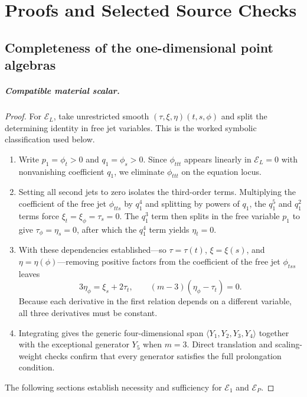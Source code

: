 \documentclass[12pt,a4paper,oneside]{report}
\numberwithin{equation}{chapter}
\theoremstyle{definition}
\theoremstyle{remark}\newtheorem{remark}[theorem]{Remark}
\begin{document}
\appendix
\chapter{Proofs and Selected Source Checks}\label{app:proofs}
\section{Completeness of the one-dimensional point algebras}\label{app:classproof}
\paragraph{Compatible material scalar.}
\begin{proof}
For $\mathcal E_L$, take unrestricted smooth $(\tau,\xi,\eta)(t,s,\phi)$ and split the determining identity in free jet variables. This is the worked symbolic classification used below.
\begin{enumerate}\setlength{\itemsep}{2pt}
\item Write $p_1=\phi_t>0$ and $q_1=\phi_s>0$. Since $\phi_{ttt}$ appears linearly in $\mathcal E_{L}=0$ with nonvanishing coefficient $q_1$, we eliminate $\phi_{ttt}$ on the equation locus.
\item Setting all second jets to zero isolates the third-order terms. Multiplying the coefficient of the free jet $\phi_{tts}$ by $q_1^4$ and splitting by powers of $q_1$, the $q_1^5$ and $q_1^2$ terms force $\xi_t=\xi_\phi=\tau_s=0$. The $q_1^3$ term then splits in the free variable $p_1$ to give $\tau_\phi=\eta_s=0$, after which the $q_1^4$ term yields $\eta_t=0$.
\item With these dependencies established---so $\tau=\tau(t)$, $\xi=\xi(s)$, and $\eta=\eta(\phi)$---removing positive factors from the coefficient of the free jet $\phi_{tss}$ leaves
\[
  3\eta_\phi=\xi_s+2\tau_t,\qquad
  (m-3)(\eta_\phi-\tau_t)=0 .
\]
Because each derivative in the first relation depends on a different variable, all three derivatives must be constant.
\item Integrating gives the generic four-dimensional span $\langle Y_1,Y_2,Y_3,Y_4\rangle$ together with the exceptional generator $Y_5$ when $m=3$. Direct translation and scaling-weight checks confirm that every generator satisfies the full prolongation condition.
\end{enumerate}
The following sections establish necessity and sufficiency for $\mathcal E_1$ and $\mathcal E_P$.
\end{proof}
\end{document}
